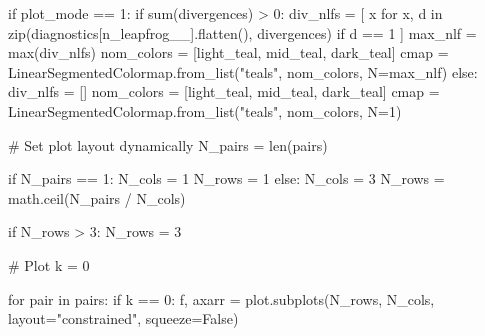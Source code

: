 \documentclass[
  letterpaper,
  DIV=11,
  numbers=noendperiod]{scrartcl}
\newenvironment{Shaded}{\begin{snugshade}}{\end{snugshade}}
\newcommand{\BuiltInTok}[1]{\textcolor[rgb]{0.00,0.23,0.31}{#1}}
\newcommand{\CommentTok}[1]{\textcolor[rgb]{0.37,0.37,0.37}{#1}}
\newcommand{\ControlFlowTok}[1]{\textcolor[rgb]{0.00,0.23,0.31}{#1}}
\newcommand{\DecValTok}[1]{\textcolor[rgb]{0.68,0.00,0.00}{#1}}
\newcommand{\KeywordTok}[1]{\textcolor[rgb]{0.00,0.23,0.31}{#1}}
\newcommand{\NormalTok}[1]{\textcolor[rgb]{0.00,0.23,0.31}{#1}}
\newcommand{\OperatorTok}[1]{\textcolor[rgb]{0.37,0.37,0.37}{#1}}
\newcommand{\StringTok}[1]{\textcolor[rgb]{0.13,0.47,0.30}{#1}}
\newcommand{\VariableTok}[1]{\textcolor[rgb]{0.07,0.07,0.07}{#1}}
\begin{document}
\begin{Shaded}
\begin{Highlighting}[]
  \ControlFlowTok{if}\NormalTok{ plot\_mode }\OperatorTok{==} \DecValTok{1}\NormalTok{:}
    \ControlFlowTok{if} \BuiltInTok{sum}\NormalTok{(divergences) }\OperatorTok{\textgreater{}} \DecValTok{0}\NormalTok{:}
\NormalTok{      div\_nlfs }\OperatorTok{=}\NormalTok{ [ x }\ControlFlowTok{for}\NormalTok{ x, d }\KeywordTok{in}
                   \BuiltInTok{zip}\NormalTok{(diagnostics[}\StringTok{\textquotesingle{}n\_leapfrog\_\_\textquotesingle{}}\NormalTok{].flatten(),}
\NormalTok{                       divergences)}
                   \ControlFlowTok{if}\NormalTok{ d }\OperatorTok{==} \DecValTok{1}\NormalTok{  ]}
\NormalTok{      max\_nlf }\OperatorTok{=} \BuiltInTok{max}\NormalTok{(div\_nlfs)}
\NormalTok{      nom\_colors }\OperatorTok{=}\NormalTok{ [light\_teal, mid\_teal, dark\_teal]}
\NormalTok{      cmap }\OperatorTok{=}\NormalTok{ LinearSegmentedColormap.from\_list(}\StringTok{"teals"}\NormalTok{, nom\_colors,}
\NormalTok{                                               N}\OperatorTok{=}\NormalTok{max\_nlf)}
    \ControlFlowTok{else}\NormalTok{:}
\NormalTok{      div\_nlfs }\OperatorTok{=}\NormalTok{ []}
\NormalTok{      nom\_colors }\OperatorTok{=}\NormalTok{ [light\_teal, mid\_teal, dark\_teal]}
\NormalTok{      cmap }\OperatorTok{=}\NormalTok{ LinearSegmentedColormap.from\_list(}\StringTok{"teals"}\NormalTok{, nom\_colors,}
\NormalTok{                                               N}\OperatorTok{=}\DecValTok{1}\NormalTok{)}

  \CommentTok{\# Set plot layout dynamically}
\NormalTok{  N\_pairs }\OperatorTok{=} \BuiltInTok{len}\NormalTok{(pairs)}

  \ControlFlowTok{if}\NormalTok{ N\_pairs }\OperatorTok{==} \DecValTok{1}\NormalTok{:}
\NormalTok{    N\_cols }\OperatorTok{=} \DecValTok{1}
\NormalTok{    N\_rows }\OperatorTok{=} \DecValTok{1}
  \ControlFlowTok{else}\NormalTok{:}
\NormalTok{    N\_cols }\OperatorTok{=} \DecValTok{3}
\NormalTok{    N\_rows }\OperatorTok{=}\NormalTok{ math.ceil(N\_pairs }\OperatorTok{/}\NormalTok{ N\_cols)}

  \ControlFlowTok{if}\NormalTok{ N\_rows }\OperatorTok{\textgreater{}} \DecValTok{3}\NormalTok{:}
\NormalTok{    N\_rows }\OperatorTok{=} \DecValTok{3}

  \CommentTok{\# Plot}
\NormalTok{  k }\OperatorTok{=} \DecValTok{0}

  \ControlFlowTok{for}\NormalTok{ pair }\KeywordTok{in}\NormalTok{ pairs:}
    \ControlFlowTok{if}\NormalTok{ k }\OperatorTok{==} \DecValTok{0}\NormalTok{:}
\NormalTok{      f, axarr }\OperatorTok{=}\NormalTok{ plot.subplots(N\_rows, N\_cols, layout}\OperatorTok{=}\StringTok{"constrained"}\NormalTok{,}
\NormalTok{                               squeeze}\OperatorTok{=}\VariableTok{False}\NormalTok{)}


\end{Highlighting}
\end{Shaded}
\end{document}
